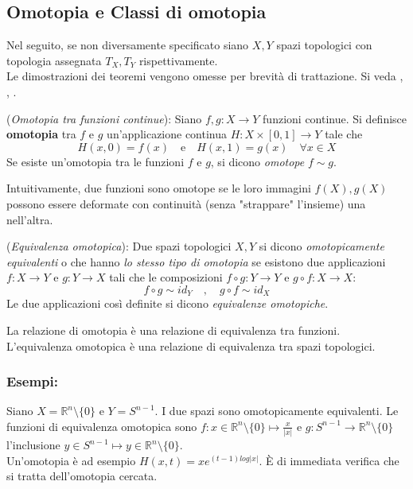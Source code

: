 \subsection{Omotopia e Classi di omotopia}
Nel seguito, se non diversamente specificato siano $X,Y$ spazi topologici con
topologia assegnata $T_X , T_Y$ rispettivamente. \\
Le dimostrazioni dei teoremi vengono omesse per brevità di trattazione. Si veda
\cite{sernesi}, \cite{fulton}, \cite{nakahara}.

\begin{definition}(\emph{Omotopia tra funzioni continue}):
   Siano $f,g : X \to Y$ funzioni continue. Si definisce \textbf{omotopia} tra
   $f$ e $g$ un'applicazione continua $H : X \times [0,1] \to Y$ tale che
   $$ H(x,0) = f(x) \quad \mathrm{e} \quad H(x,1) = g(x) \quad \forall x \in X$$
   Se esiste un'omotopia tra le funzioni $f$ e $g$, si dicono \emph{omotope} $f \sim g$.
   \label{def:omotopia}
\end{definition}

Intuitivamente, due funzioni sono omotope se le loro immagini $f(X),g(X)$ possono essere
deformate con continuità (senza "strappare" l'insieme) una nell'altra.

\begin{definition}(\emph{Equivalenza omotopica}):
   Due spazi topologici $X,Y$ si dicono \emph{omotopicamente equivalenti} o che hanno
   \emph{lo stesso tipo di omotopia} se esistono due applicazioni $f : X \to Y$ e
   $g : Y \to X$ tali che le composizioni $f \circ g : Y \to Y$ e
   $g \circ f : X \to X$:
      $$  f \circ g \sim id_Y \quad , \quad g \circ f \sim id_X $$
   Le due applicazioni così definite si dicono \emph{equivalenze omotopiche}.
\end{definition}

\begin{lemma}
   La relazione di omotopia è una relazione di equivalenza tra funzioni.
   L'equivalenza omotopica è una relazione di equivalenza tra spazi topologici.
\end{lemma}

\subsubsection{Esempi:}
\begin{example}
   Siano $X = \mathbb{R}^n\setminus\{0\}$ e $Y = S^{n-1}$. I due spazi sono
   omotopicamente equivalenti. Le funzioni di equivalenza omotopica sono
   $f : x \in \mathbb{R}^n\setminus\{0\} \mapsto \frac{x}{|x|}$ e
   $g : S^{n-1} \to \mathbb{R}^n\setminus\{0\}$ l'inclusione
   $y \in S^{n-1} \mapsto y \in \mathbb{R}^n\setminus\{0\}$. \\
   Un'omotopia è ad esempio $H(x,t) = x e^{(t-1)log|x|}$. È di immediata verifica
   che si tratta dell'omotopia cercata.
\end{example}

